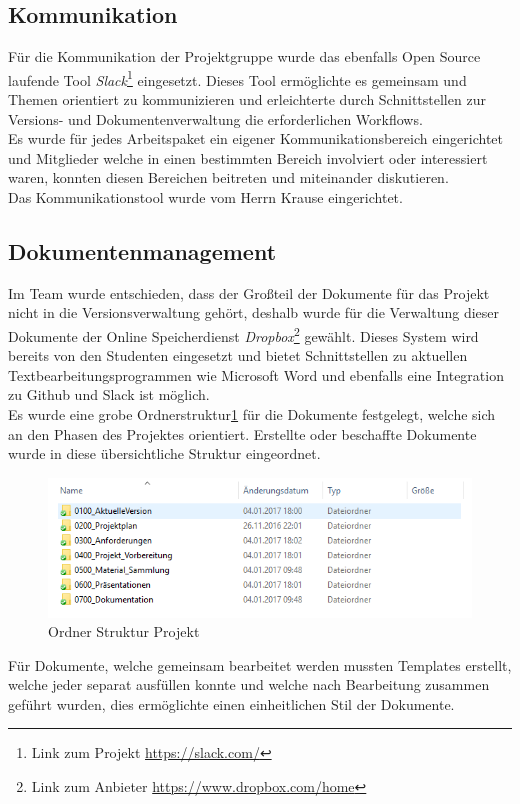 \subsection{Kommunikation}
Für die Kommunikation der Projektgruppe wurde das ebenfalls Open Source laufende Tool \textit{Slack}\footnote{Link zum Projekt \url{https://slack.com/}} eingesetzt. Dieses Tool ermöglichte es gemeinsam und Themen orientiert zu kommunizieren und erleichterte durch Schnittstellen zur Versions- und Dokumentenverwaltung die erforderlichen Workflows.\\
Es wurde für jedes Arbeitspaket ein eigener Kommunikationsbereich eingerichtet und Mitglieder welche in einen bestimmten Bereich involviert oder interessiert waren, konnten diesen Bereichen beitreten und miteinander diskutieren.\\
Das Kommunikationstool wurde vom Herrn Krause eingerichtet.

\subsection{Dokumentenmanagement}
Im Team wurde entschieden, dass der Großteil der Dokumente für das Projekt nicht in die Versionsverwaltung gehört, deshalb wurde für die Verwaltung dieser Dokumente der Online Speicherdienst \textit{Dropbox}\footnote{Link zum Anbieter \url{https://www.dropbox.com/home}} gewählt. Dieses System wird bereits von den Studenten eingesetzt und bietet Schnittstellen zu aktuellen Textbearbeitungsprogrammen wie Microsoft Word und ebenfalls eine Integration zu Github und Slack ist möglich.\\
Es wurde eine grobe Ordnerstruktur\ref{fig:folderStruct} für die Dokumente festgelegt, welche sich an den Phasen des Projektes orientiert. Erstellte oder beschaffte Dokumente wurde in diese übersichtliche Struktur eingeordnet.\\
\begin{figure}[h]
\includegraphics[scale=1]{projectdefinition/Bilder/FolderStructure}
\caption{Ordner Struktur Projekt}
\label{fig:folderStruct}
\end{figure}
Für Dokumente, welche gemeinsam bearbeitet werden mussten Templates erstellt, welche jeder separat ausfüllen konnte und welche nach Bearbeitung zusammen geführt wurden, dies ermöglichte einen einheitlichen Stil der Dokumente.

